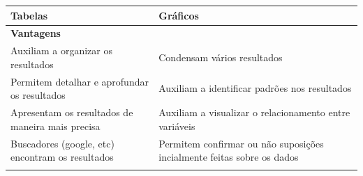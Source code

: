 \documentclass[
]{book}
\begin{document}
\begin{longtable}[]{@{}ll@{}}
\toprule
\begin{minipage}[b]{0.47\columnwidth}\raggedright
Tabelas\strut
\end{minipage} & \begin{minipage}[b]{0.47\columnwidth}\raggedright
Gráficos\strut
\end{minipage}\tabularnewline
\midrule
\endhead
\begin{minipage}[t]{0.47\columnwidth}\raggedright
\textbf{Vantagens}\strut
\end{minipage} & \begin{minipage}[t]{0.47\columnwidth}\raggedright
\strut
\end{minipage}\tabularnewline
\begin{minipage}[t]{0.47\columnwidth}\raggedright
Auxiliam a organizar os resultados\strut
\end{minipage} & \begin{minipage}[t]{0.47\columnwidth}\raggedright
Condensam vários resultados\strut
\end{minipage}\tabularnewline
\begin{minipage}[t]{0.47\columnwidth}\raggedright
Permitem detalhar e aprofundar os resultados\strut
\end{minipage} & \begin{minipage}[t]{0.47\columnwidth}\raggedright
Auxiliam a identificar padrões nos resultados\strut
\end{minipage}\tabularnewline
\begin{minipage}[t]{0.47\columnwidth}\raggedright
Apresentam os resultados de maneira mais precisa\strut
\end{minipage} & \begin{minipage}[t]{0.47\columnwidth}\raggedright
Auxiliam a visualizar o relacionamento entre variáveis\strut
\end{minipage}\tabularnewline
\begin{minipage}[t]{0.47\columnwidth}\raggedright
Buscadores (google, etc) encontram os resultados\strut
\end{minipage} & \begin{minipage}[t]{0.47\columnwidth}\raggedright
Permitem confirmar ou não suposições incialmente feitas sobre os dados\strut
\end{minipage}\tabularnewline
\begin{minipage}[t]{0.47\columnwidth}\raggedright
\strut
\end{minipage} & \begin{minipage}[t]{0.47\columnwidth}\raggedright

\end{minipage}
\end{longtable}
\end{document}
